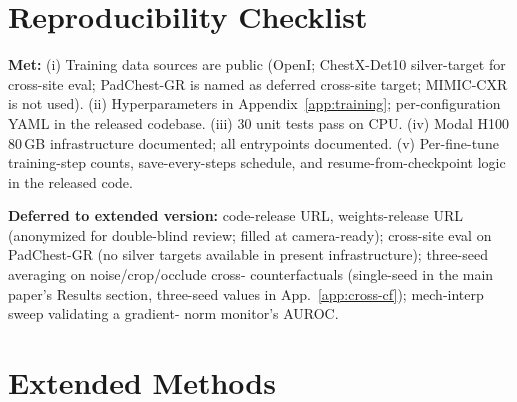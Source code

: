 \documentclass{article}
\begin{document}

\printAffiliationsAndNotice{}



\appendix
\onecolumn

\section{Reproducibility Checklist}
\label{app:repro}

\textbf{Met:} (i) Training data sources are public (OpenI; ChestX-Det10
silver-target for cross-site eval; PadChest-GR is named as deferred
cross-site target; MIMIC-CXR is not used). (ii) Hyperparameters in
Appendix~\ref{app:training}; per-configuration YAML in the released
codebase. (iii) $30$ unit tests pass on CPU. (iv) Modal H100 80\,GB
infrastructure documented; all entrypoints documented.
(v) Per-fine-tune training-step counts, save-every-steps schedule, and
resume-from-checkpoint logic in the released code.

\textbf{Deferred to extended version:} code-release URL, weights-release
URL (anonymized for double-blind review; filled at camera-ready);
cross-site eval on PadChest-GR (no silver targets available in present
infrastructure); three-seed averaging on noise/crop/occlude cross-
counterfactuals (single-seed in the main paper's Results section, three-seed values
in App.~\ref{app:cross-cf}); mech-interp sweep validating a gradient-
norm monitor's AUROC.

\section{Extended Methods}
\label{app:methods}
\end{document}
